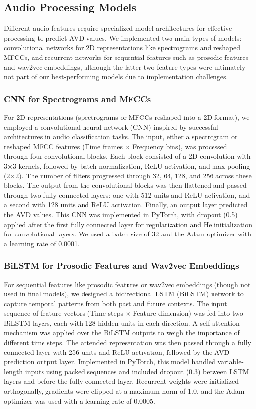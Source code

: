 \documentclass[12pt]{article}
\begin{document}
\subsection{Audio Processing Models}
Different audio features require specialized model architectures for effective processing to predict AVD values. We implemented two main types of models: convolutional networks for 2D representations like spectrograms and reshaped MFCCs, and recurrent networks for sequential features such as prosodic features and wav2vec embeddings, although the latter two feature types were ultimately not part of our best-performing models due to implementation challenges.

\subsubsection{CNN for Spectrograms and MFCCs}
For 2D representations (spectrograms or MFCCs reshaped into a 2D format), we employed a convolutional neural network (CNN) inspired by successful architectures in audio classification tasks. The input, either a spectrogram or reshaped MFCC features (Time frames × Frequency bins), was processed through four convolutional blocks. Each block consisted of a 2D convolution with 3×3 kernels, followed by batch normalization, ReLU activation, and max-pooling (2×2). The number of filters progressed through 32, 64, 128, and 256 across these blocks. The output from the convolutional blocks was then flattened and passed through two fully connected layers: one with 512 units and ReLU activation, and a second with 128 units and ReLU activation. Finally, an output layer predicted the AVD values. This CNN was implemented in PyTorch, with dropout (0.5) applied after the first fully connected layer for regularization and He initialization for convolutional layers. We used a batch size of 32 and the Adam optimizer with a learning rate of 0.0001.

\subsubsection{BiLSTM for Prosodic Features and Wav2vec Embeddings}
For sequential features like prosodic features or wav2vec embeddings (though not used in final models), we designed a bidirectional LSTM (BiLSTM) network to capture temporal patterns from both past and future contexts. The input sequence of feature vectors (Time steps × Feature dimension) was fed into two BiLSTM layers, each with 128 hidden units in each direction. A self-attention mechanism was applied over the BiLSTM outputs to weigh the importance of different time steps. The attended representation was then passed through a fully connected layer with 256 units and ReLU activation, followed by the AVD prediction output layer. Implemented in PyTorch, this model handled variable-length inputs using packed sequences and included dropout (0.3) between LSTM layers and before the fully connected layer. Recurrent weights were initialized orthogonally, gradients were clipped at a maximum norm of 1.0, and the Adam optimizer was used with a learning rate of 0.0005.
\end{document}
